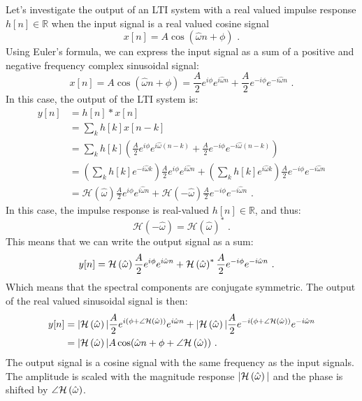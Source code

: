 Let's investigate the output of an LTI system with a real valued
impulse response $h[n]\in\mathbb{R}$ when the input signal is a real
valued cosine signal
\begin{equation}
x[n] = A\cos(\hat{\omega} n + \phi)\,\,.
\end{equation}
Using Euler's formula, we can express the input signal as a sum of a
positive and negative frequency complex sinusoidal signal:
\begin{equation}
x[n] = A \cos(\hat{\omega} n + \phi) = \frac{A}{2}e^{i\phi}e^{i\hat{\omega} n} + \frac{A}{2}e^{-i\phi}e^{-i\hat{\omega} n}\,\,.
\end{equation}
In this case, the output of the LTI system is:
\begin{align}
y[n] &= h[n]*x[n]\\
&= \sum_{k} h[k]x[n-k]\\
&= \sum_{k} h[k] \left( \frac{A}{2}e^{i\phi}e^{i\hat{\omega} (n-k)} + \frac{A}{2}e^{-i\phi}e^{-i\hat{\omega} (n-k)} \right)\\
 &= \left(\sum_{k} h[k] e^{-i\hat{\omega} k}\right) \frac{A}{2}e^{i\phi}e^{i\hat{\omega} n} + \left(\sum_{k} h[k] e^{i\hat{\omega} k}\right) \frac{A}{2}e^{-i\phi} e^{-i\hat{\omega} n}\\
 &= \mathcal{H}(\hat{\omega}) \frac{A}{2}e^{i\phi}e^{i\hat{\omega} n} + \mathcal{H}(-\hat{\omega}) \frac{A}{2}e^{-i\phi}e^{-i\hat{\omega} n}\,\,.
 \end{align} 
In this case, the impulse response is real-valued $h[n]\in \mathbb{R}$, and thus:
\begin{equation}
\mathcal{H}(-\hat{\omega}) = \mathcal{H}(\hat{\omega})^*\,\,.
\end{equation}
This means that we can write the output signal as a sum:
\begin{align}
y[n] &= \mathcal{H}\left(\hat{\omega}\right) \frac{A}{2}e^{i\phi}e^{i\hat{\omega} n} +  \mathcal{H}\left(\hat{\omega}\right)^*\frac{A}{2}e^{-i\phi} e^{-i\hat{\omega} n}\,\,.
\end{align}
Which means that the spectral components are conjugate symmetric. The output of the real valued sinusoidal signal is then:
\begin{align}
y[n] &= |\mathcal{H}\left(\hat{\omega}\right)|\frac{A}{2} e^{i(\phi + \angle \mathcal{H}\left(\hat{\omega}\right))}e^{i\hat{\omega} n} + |\mathcal{H}\left(\hat{\omega}\right)|\frac{A}{2}e^{-i(\phi + \angle \mathcal{H}\left(\hat{\omega}\right))} e^{-i\hat{\omega} n} \\
 & = |\mathcal{H}\left(\hat{\omega}\right)| A \cos(\hat{\omega} n + \phi + \angle \mathcal{H}\left(\hat{\omega}\right))\,\,.
\end{align}
The output signal is a cosine signal with the same frequency as the
input signals. The amplitude is scaled with the magnitude response
$|\mathcal{H}\left(\hat{\omega}\right)|$ and the phase is shifted by $\angle \mathcal{H}\left(\hat{\omega}\right)$.

